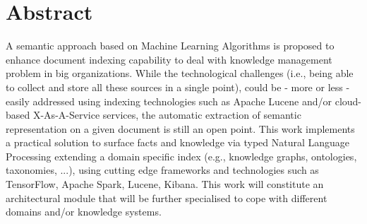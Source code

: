 \documentclass[\main/main.tex]{subfiles}
\begin{document}
\chapter*{Abstract}
A semantic approach based on Machine Learning Algorithms is proposed to enhance document indexing capability to deal with knowledge management problem in big organizations.
While the technological challenges (i.e., being able to collect and store all these sources in a single point), could be - more or less - easily addressed using indexing technologies such as Apache Lucene and/or cloud-based X-As-A-Service services, the automatic extraction of semantic representation on a given document is still an open point.
This work implements a practical solution to surface facts and knowledge via typed Natural Language Processing extending a domain specific index (e.g., knowledge graphs, ontologies, taxonomies, ...), using cutting edge frameworks and technologies such as TensorFlow, Apache Spark, Lucene, Kibana.
This work will constitute an architectural module that will be further specialised to cope with different domains and/or knowledge systems.
\end{document}
